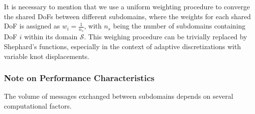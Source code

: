 It is necessary to mention that we use a uniform weighting procedure to converge the shared DoFs between different subdomains, where the weights for each shared DoF is assigned as $w_i=\frac{1}{n_s}$, with $n_s$ being the number of subdomains containing DoF $i$ within its domain $\mathcal{S}$. This weighing procedure can be trivially replaced by Shephard's functions, especially in the context of adaptive discretizations with variable knot displacements.





\subsubsection{Note on Performance Characteristics}


%
%
The volume of messages exchanged between subdomains depends on several computational factors.

